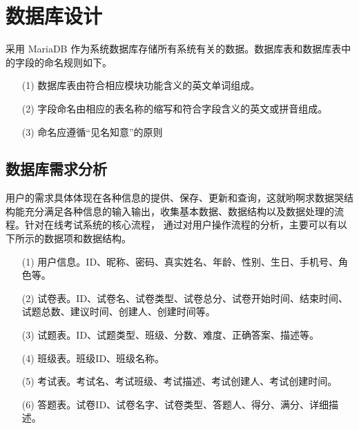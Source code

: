 \chapter{数据库设计}
采用 MariaDB 作为系统数据库存储所有系统有关的数据。数据库表和数据库表中的字段的命名规则如下。
\begin{enumerate}
	\item[(1)] 数据库表由符合相应模块功能含义的英文单词组成。
	\item[(2)] 字段命名由相应的表名称的缩写和符合字段含义的英文或拼音组成。
	\item[(3)] 命名应遵循“见名知意”的原则
\end{enumerate}
\section{数据库需求分析}
用户的需求具体体现在各种信息的提供、保存、更新和查询，这就哟啊求数据哭结构能充分满足各种信息的输入输出，收集基本数据、数据结构以及数据处理的流程。针对在线考试系统的核心流程，
通过对用户操作流程的分析，主要可以有以下所示的数据项和数据结构。
\begin{enumerate}
	\item[(1)] 用户信息。ID、昵称、密码、真实姓名、年龄、性别、生日、手机号、角色等。
	\item[(2)] 试卷表。ID、试卷名、试卷类型、试卷总分、试卷开始时间、结束时间、试题总数、建议时间、创建人、创建时间等。
	\item[(3)] 试题表。ID、试题类型、班级、分数、难度、正确答案、描述等。
	\item[(4)] 班级表。班级ID、班级名称。
	\item[(5)] 考试表。考试名、考试班级、考试描述、考试创建人、考试创建时间。
	\item[(6)] 答题表。试卷ID、试卷名字、试卷类型、答题人、得分、满分、详细描述。 
\end{enumerate}
